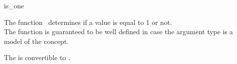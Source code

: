 \begin{ccRefFunction}{is_one}

\ccDefinition

The function \ccRefName\ determines if a value is equal to 1 or not.\\
The function is guaranteed to be well defined in case the argument type 
is a model of the  concept. 


        { The  is convertible to . }


\ccSeeAlso

\\
\\

\end{ccRefFunction}
